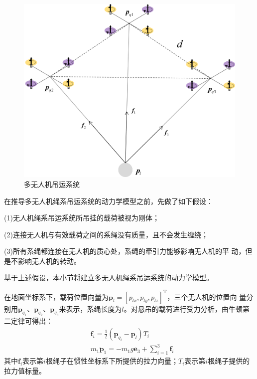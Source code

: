 \documentclass[lang=chs, degree=master, blindreview=false, winfonts=true]{yanputhesis}
\begin{document}
\begin{figure}[hbt!]
	\centering
	\includegraphics[width=28pc]{picture/2_3.png} 
	\caption{多无人机吊运系统} \label{2_3}
\end{figure}

在推导多无人机绳系吊运系统的动力学模型之前，先做了如下假设：



(1)无人机绳系吊运系统所吊挂的载荷被视为刚体； 


(2)连接无人机与有效载荷之间的系绳没有质量，且不会发生缠绕；

(3)所有系绳都连接在无人机的质心处，系绳的牵引力能够影响无人机的平
动，但是不影响无人机的转动。 

基于上述假设，本小节将建立多无人机绳系吊运系统的动力学模型。


在地面坐标系下，载荷位置向量为$\bm p_{l}=[p_{lx},p_{ly},p_{lz}]^{\mathrm{T}}$，三个无人机的位置向
量分别用$\bm p_{q_1}$、$\bm p_{q_2}$、$\bm p_{q_3}$来表示，系绳长度为$l$。对悬吊的载荷进行受力分析，由牛顿第二定律可得出：
\begin{equation}
	\label{2-15}
	\begin{aligned}
		&\bm f_{i}=\frac{1}{l}(\bm p_{q_i}-\bm p_{l})T_{i} \\
		&m_{1}\ddot{\bm p}_{1}=-m_{1}g\bm e_{3}+\sum_{i=1}^{3}\bm f_{i}
	\end{aligned}
\end{equation}
其中$\bm f_{i}$表示第$i$根绳子在惯性坐标系下所提供的拉力向量；$T_{i}$表示第$i$根绳子提供的拉力值标量。
\end{document}
